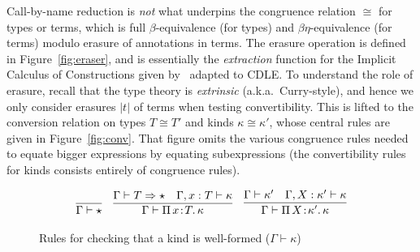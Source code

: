 \documentclass{article}
\newcommand{\abs}[4]{{#1}\, #2\! : \! #3.\, #4}
\newcommand{\tpsynth}[0]{\Rightarrow}
\begin{document}
Call-by-name reduction is \emph{not} what underpins the
congruence relation \(\cong\) for types or terms, which is full
\(\beta\)-equivalence (for types) and \(\beta\eta\)-equivalence (for terms)
modulo erasure of annotations in terms.
The erasure operation is defined in Figure~\ref{fig:eraser}, and is essentially
the \emph{extraction} function for the Implicit Calculus of Constructions given
by~\cite{BB08_ICC-as-a-Programming-Language} adapted to CDLE.
To understand the role of erasure, recall that the type theory is \emph{extrinsic} (a.k.a.\
Curry-style), and hence we only consider erasures \(|t|\) of terms when testing
convertibility.
This is lifted to the conversion relation on types \(T \cong T'\) and kinds
\(\kappa \cong \kappa'\), whose central rules are given in
Figure~\ref{fig:conv}.
That figure omits the various congruence rules needed to equate bigger
expressions by equating subexpressions (the convertibility rules for kinds
consists entirely of congruence rules).

\begin{figure}
  \[
  \begin{array}{ccc}
    \infer{\Gamma \vdash \star}{\ } &
    \infer{\Gamma\vdash\abs{\Pi}{x}{T}{\kappa}}{\Gamma \vdash T \tpsynth \star & \Gamma,x:T\vdash\kappa} &
    \infer{\Gamma\vdash\abs{\Pi}{X}{\kappa'}{\kappa}}{\Gamma \vdash \kappa' & \Gamma,X:\kappa'\vdash\kappa}
  \end{array}
  \]
  \caption{Rules for checking that a kind is well-formed ($\Gamma \vdash \kappa$)}
  \label{fig:superknd}
\end{figure}
\end{document}
